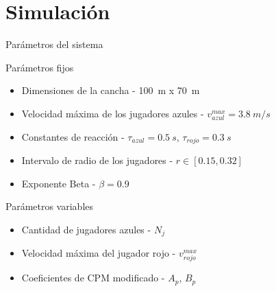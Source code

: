 \section{Simulación}\label{sec:simulacion}
\begin{frame}{Parámetros del sistema}
    \begin{block}{Parámetros fijos}
        \begin{itemize}
            \item Dimensiones de la cancha - 100\ m x 70\ m\)
            \item Velocidad máxima de los jugadores azules - \(v_{azul}^{max} = 3.8\ m/s\)
            \item Constantes de reacción - \(\tau_{azul} = 0.5\ s\), \(\tau_{rojo} = 0.3\ s\)
            \item Intervalo de radio de los jugadores - \(r \in [0.15, 0.32]\)
            \item Exponente Beta - \(\beta = 0.9\)
        \end{itemize}
    \end{block}
    \begin{block}{Parámetros variables}
        \begin{itemize}
            \item Cantidad de jugadores azules - \(N_j\)
            \item Velocidad máxima del jugador rojo - \(v_{rojo}^{max}\)
            \item Coeficientes de CPM modificado - \(A_p\), \(B_p\)
        \end{itemize}
    \end{block}
\end{frame}

